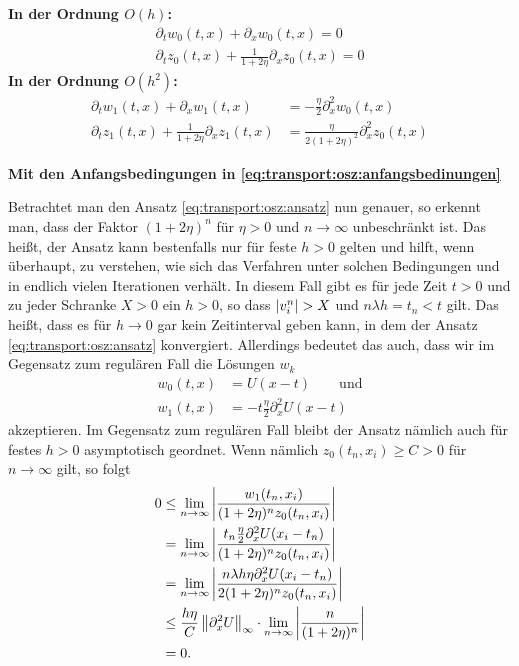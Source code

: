 \vspace{0.4cm}
\noindent \textbf{In der Ordnung $O(h)$:}
\begin{align}
\partial_t w_0(t, x) + \partial_x w_0(t, x) = 0 \label{eq:transport:osz:oh_A}\\
\partial_t z_0(t, x) + \frac {1} {1 + 2\eta} \partial_x z_0(t, x) = 0 \label{eq:transport:osz:oh_B}
\end{align}
\vspace{0.4cm}
\noindent \textbf{In der Ordnung $O(h^2)$:}
\begin{align}\label{eq:transport:osz:oh2_A}
\partial_t w_1(t, x) + \partial_x w_1(t, x) &= - \frac {\eta}{2} \partial^2_x w_0(t, x)\\
\partial_t z_1(t, x) + \frac{1}{1 + 2 \eta} \partial_x z_1(t, x) &= \frac{\eta}{2 (1 + 2 \eta)^2} \partial^2_x z_0(t, x) \label{eq:transport:osz:oh2_B}
\end{align}

\noindent \textbf{Mit den Anfangsbedingungen in \eqref{eq:transport:osz:anfangsbedinungen}}


\vspace{0.4cm}
Betrachtet man den Ansatz \eqref{eq:transport:osz:ansatz} nun genauer, so erkennt man, dass der Faktor $(1 + 2 \eta)^n$ für $\eta > 0$ und $n \to \infty$ unbeschränkt ist.
Das heißt, der Ansatz kann bestenfalls nur für feste $h > 0$ gelten und hilft, wenn überhaupt, zu verstehen, wie sich das Verfahren unter solchen Bedingungen und in endlich vielen Iterationen verhält.
In diesem Fall gibt es für jede Zeit $t > 0$ und zu jeder Schranke $X > 0$ ein $h > 0$, so dass $\left| v^n_i \right| > X$ und $n \lambda h = t_n < t$ gilt.
Das heißt, dass es für $h \to 0$ gar kein Zeitinterval geben kann, in dem der Ansatz \eqref{eq:transport:osz:ansatz} konvergiert. 
Allerdings bedeutet das auch, dass wir im Gegensatz zum regulären Fall die Lösungen $w_k$
\begin{align}\label{eq:transport:osz:wk_loesungen}
w_0(t, x) &= U(x - t) \qquad \text{und}\\
w_1(t, x) &= - t \frac{\eta} 2 \partial^2_x U(x - t)
\end{align}
akzeptieren.
Im Gegensatz zum regulären Fall bleibt der Ansatz nämlich auch für festes $h > 0$ asymptotisch geordnet.
Wenn nämlich $z_0(t_n, x_i) \geq C > 0$ für $n \to \infty$ gilt, so folgt
\begin{align*}
0 &\leq \lim_{n \to \infty} \left| \frac{w_1(t_n,x_i)}{(1 + 2 \eta)^n z_0(t_n, x_i)} \right|\\
&= \lim_{n \to \infty} \left| \frac{t_n \frac{\eta} 2 \partial^2_x U(x_i - t_n)}{(1 + 2 \eta)^n z_0(t_n, x_i)} \right|\\
&= \lim_{n \to \infty} \left| \frac{n \lambda h \eta \partial^2_x U(x_i - t_n)}{2 (1 + 2 \eta)^{n} z_0(t_n, x_i)} \right|\\
&\leq \frac{h \eta}{C} \left\lVert \partial^2_x U \right\rVert_\infty \cdot \lim_{n \to \infty} \left| \frac{n}{(1 + 2 \eta)^{n}} \right|\\
&= 0.
\end{align*}

